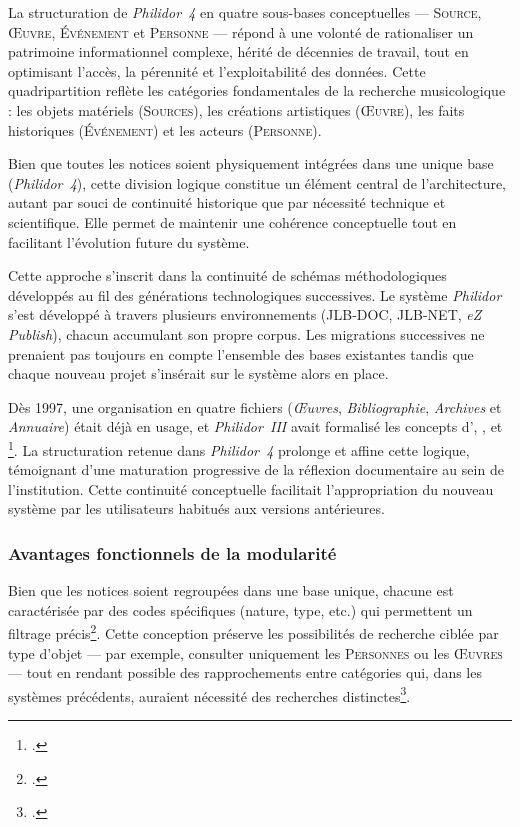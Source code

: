 La structuration de \textit{Philidor~4} en quatre sous-bases conceptuelles --- \textsc{Source}, \textsc{Œuvre}, \textsc{Événement} et \textsc{Personne} --- répond à une volonté de rationaliser un patrimoine informationnel complexe, hérité de décennies de travail, tout en optimisant l'accès, la pérennité et l'exploitabilité des données. Cette quadripartition reflète les catégories fondamentales de la recherche musicologique : les objets matériels (\textsc{Sources}), les créations artistiques (\textsc{Œuvre}), les faits historiques (\textsc{Événement}) et les acteurs (\textsc{Personne}).

Bien que toutes les notices soient physiquement intégrées dans une unique base (\textit{Philidor~4}), cette division logique constitue un élément central de l'architecture, autant par souci de continuité historique que par nécessité technique et scientifique. Elle permet de maintenir une cohérence conceptuelle tout en facilitant l'évolution future du système.

Cette approche s'inscrit dans la continuité de schémas méthodologiques développés au fil des générations technologiques successives. Le système \textit{Philidor} s'est développé à travers plusieurs environnements (JLB-DOC, JLB-NET, \textit{eZ Publish}), chacun accumulant son propre corpus. Les migrations successives ne prenaient pas toujours en compte l'ensemble des bases existantes tandis que chaque nouveau projet s'insérait sur le système alors en place.

Dès 1997, une organisation en quatre fichiers (\textit{Œuvres}, \textit{Bibliographie}, \textit{Archives} et \textit{Annuaire}) était déjà en usage, et \textit{Philidor~III} avait formalisé les concepts d', ,  et \footcite[Rapport sur le projet Philidor de Jérémie Crublet, juin 2006]{michelbenoitDocumentationTechniqueBibliographique1997}. La structuration retenue dans \textit{Philidor~4} prolonge et affine cette logique, témoignant d'une maturation progressive de la réflexion documentaire au sein de l'institution. Cette continuité conceptuelle facilitait l'appropriation du nouveau système par les utilisateurs habitués aux versions antérieures.

\subsubsection{Avantages fonctionnels de la modularité}

Bien que les notices soient regroupées dans une base unique, chacune est caractérisée par des codes spécifiques (nature, type, etc.) qui permettent un filtrage précis\footcite{laurentguilloRapportMigrationAnciennes2022}. Cette conception préserve les possibilités de recherche ciblée par type d'objet --- par exemple, consulter uniquement les \textsc{Personnes} ou les \textsc{Œuvres} --- tout en rendant possible des rapprochements entre catégories qui, dans les systèmes précédents, auraient nécessité des recherches distinctes\footcite{laurentguilloRapportMigrationAnciennes2022}.

